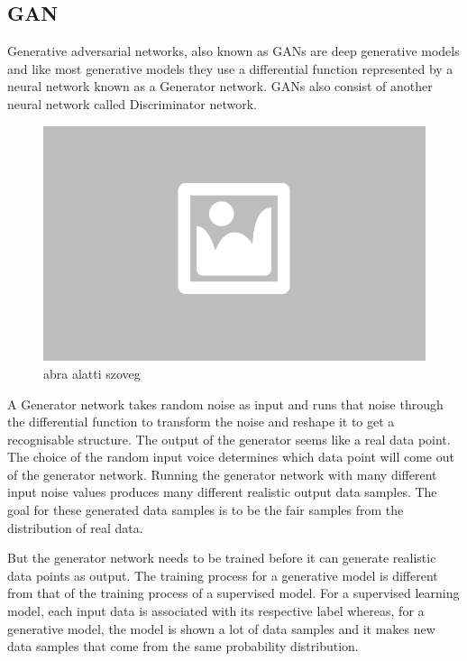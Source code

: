 \subsection{GAN}

Generative adversarial networks, also known as GANs are deep generative models and like most generative models they use a differential function represented by a neural network known as a Generator network. GANs also consist of another neural network called Discriminator network.

\begin{figure}[h]
	\centering
	\includegraphics[width=0.65\columnwidth]{figures/abra.png}
	\caption{abra alatti szoveg}
\end{figure}

A Generator network takes random noise as input and runs that noise through the differential function to transform the noise and reshape it to get a recognisable structure. The output of the generator seems like a real data point. The choice of the random input voice determines which data point will come out of the generator network. Running the generator network with many different input noise values produces many different realistic output data samples. The goal for these generated data samples is to be the fair samples from the distribution of real data.

But the generator network needs to be trained before it can generate realistic data points as output. The training process for a generative model is different from that of the training process of a supervised model. For a supervised learning model, each input data is associated with its respective label whereas, for a generative model, the model is shown a lot of data samples and it makes new data samples that come from the same probability distribution.

